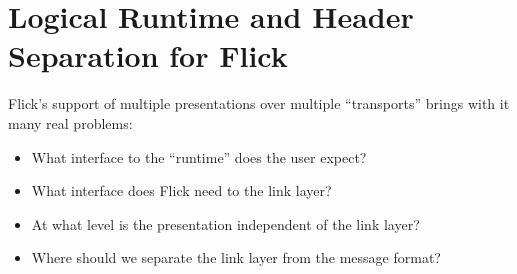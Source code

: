 


\section{Logical Runtime and Header Separation for Flick}
\label{sec:Runtime:Logical Runtime and Header Separation for Flick}

Flick's support of multiple presentations over multiple ``transports'' brings
with it many real problems:

\begin{itemize}
  \item What interface to the ``runtime'' does the user expect?
  \item What interface does Flick need to the link layer?
  \item At what level is the presentation independent of the link layer?
  \item Where should we separate the link layer from the message format?
\end{itemize}

